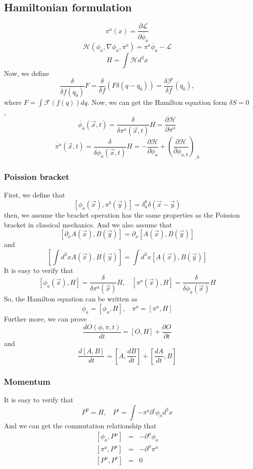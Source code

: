 \documentclass{article}
\begin{document}
\subsection{Hamiltonian formulation}
\[\pi^a(x) = \frac{\partial \mathcal{L}}{\partial \dot{\phi_a}}\]
\[\mathcal{H}(\phi_a,\nabla \phi_a,\pi^a) = \pi^a \dot{\phi_a} - \mathcal{L}\]
\[H = \int \mathcal{H} d^3 x\]
Now, we define
\[\frac{\delta}{\delta f(q_0)} F = \frac{\delta}{\delta f} (F \delta(q-q_0)) = \frac{\delta \mathcal{F}}{\delta f}(q_0),\]where $ F = \int \mathcal{F}(f(q)) dq$.
Now, we can get the Hamilton equation form $\delta S =0$,
\[\dot{\phi_a}(\vec{x},t) = \frac{\delta}{\delta \pi^a(\vec{x},t)} H = \frac{\partial \mathcal{H}}{\partial \pi^a}\]
\[\dot{\pi^a}(\vec{x},t) = \frac{\delta}{\delta \phi_a(\vec{x},t)} H = - \frac{\partial \mathcal{H}}{\partial \phi_a} + \left(\frac{\partial \mathcal{H}}{\partial \phi_{a,b}}\right)_{,b}\]

\subsubsection{Poission bracket}
First, we define that
\[[\phi_a(\vec{x}),\pi^b(\vec{y})] = \delta^{b}_{a} \delta(\vec{x}-\vec{y})\]
then, we assume the bracket operation has the same properties as the Poission bracket in classical mechanics. And we also assume that
\[[\partial_x A(\vec{x}),B(\vec{y})] = \partial_x [A(\vec{x}),B(\vec{y})]\]
and
\[\left[\int d^3 x A(\vec{x}),B(\vec{y})\right] = \int d^3 x [A(\vec{x}),B(\vec{y})]\]
It is easy to verify that
\[[\phi_a(\vec{x}),H] = \frac{\delta }{\delta \pi^a(\vec{x})} H, \ \ \ \ [\pi^a(\vec{x}),H] = \frac{\delta }{\delta \phi_a(\vec{x})} H\]
So, the Hamilton equation can be written as
\[\dot{\phi_a} = [\phi_a,H], \ \ \ \ \dot{\pi^a} = [\pi^a,H]\]
Further more, we can prove
\[\frac{dO(\phi,\pi,t)}{dt} = [O,H] + \frac{\partial O}{\partial t}\]
and
\[\frac{d[A,B]}{dt} = [A,\frac{dB}{dt}] + [\frac{dA}{dt},B]  \]
\subsubsection{Momentum}
It is easy to verify that
\[P^{0} = H, \ \ \ \ P^{i} = \int -\pi^a \partial^i \phi_a d^3 x\]
And we can get the commutation relationship that
\begin{eqnarray}
\left[\phi_a,P^{\mu}\right] &=& -\partial^{\mu} \phi_a \nonumber \\
\left[\pi^a,P^{\mu}\right] &=& -\partial^{\mu} \pi^a \nonumber \\
\left[P^{\mu},P^{\nu}\right] &=& 0 \nonumber 
\end{eqnarray}
\end{document}
